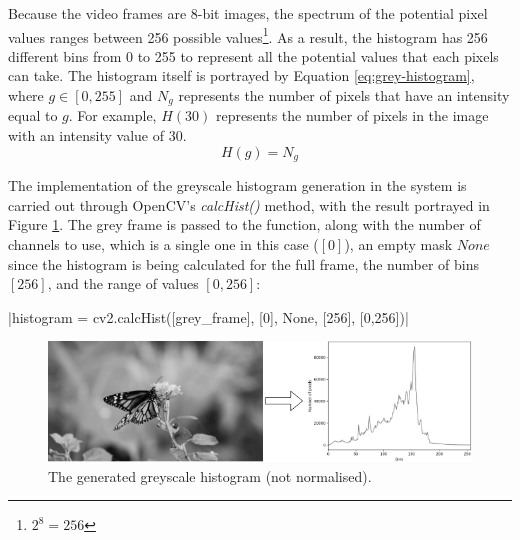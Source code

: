 Because the video frames are 8-bit images, the spectrum of the potential pixel values ranges between 256 possible values\footnote{$2^8=256$}. As a result, the histogram has 256 different bins from 0 to 255 to represent all the potential values that each pixels can take. The histogram itself is portrayed by Equation \ref{eq:grey-histogram}, where $g\in [0, 255]$ and $N_g$ represents the number of pixels that have an intensity equal to $g$. For example, $H(30)$ represents the number of pixels in the image with an intensity value of 30.
\begin{equation}
\label{eq:grey-histogram}
    H(g)=N_g
\end{equation}

The implementation of the greyscale histogram generation in the system is carried out through OpenCV's \textit{calcHist()} method, with the result portrayed in Figure \ref{fig:implementation-greyscale_not_normalised}. The grey frame is passed to the function, along with the number of channels to use, which is a single one in this case ($[0]$), an empty mask $None$ since the histogram is being calculated for the full frame, the number of bins $[256]$, and the range of values $[0, 256]$:

|histogram = cv2.calcHist([grey_frame], [0], None, [256], [0,256])|

\begin{figure}[h] 
\centerline{\includegraphics[width=\textwidth]{figures/implementation/greyscale_not_normalised.png}}
\caption{\label{fig:implementation-greyscale_not_normalised}The generated greyscale histogram (not normalised).}
\end{figure}

